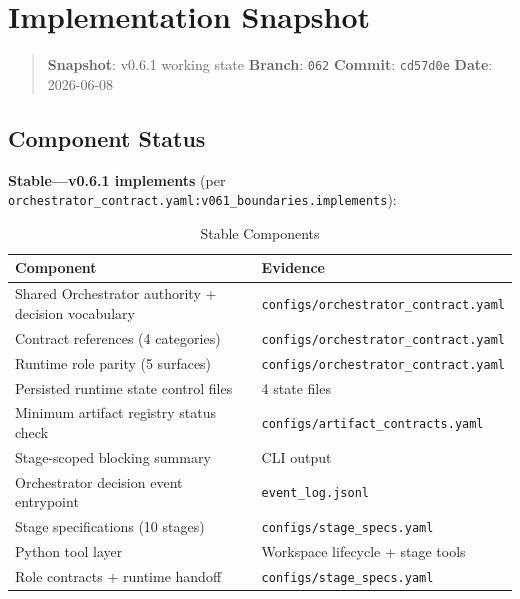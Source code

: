 \documentclass[11pt,a4paper]{article}
\begin{document}
\section{Implementation Snapshot}
\label{sec:snapshot}

\begin{quote}
\textbf{Snapshot}: v0.6.1 working state \textbar{} \textbf{Branch}: \texttt{062} \textbar{} \textbf{Commit}: \texttt{cd57d0e} \textbar{} \textbf{Date}: 2026-06-08
\end{quote}

\subsection{Component Status}

\textbf{Stable---v0.6.1 implements} (per \texttt{orchestrator\_contract.yaml:v061\_boundaries.implements}):

\begin{table}[ht]
\centering
\caption{Stable Components}
\label{tab:stable}
\footnotesize
\begin{tabular}{@{}ll@{}}
\toprule
\textbf{Component} & \textbf{Evidence} \\
\midrule
Shared Orchestrator authority + decision vocabulary & \texttt{configs/orchestrator\_contract.yaml} \\
Contract references (4 categories) & \texttt{configs/orchestrator\_contract.yaml} \\
Runtime role parity (5 surfaces) & \texttt{configs/orchestrator\_contract.yaml} \\
Persisted runtime state control files & 4 state files \\
Minimum artifact registry status check & \texttt{configs/artifact\_contracts.yaml} \\
Stage-scoped blocking summary & CLI output \\
Orchestrator decision event entrypoint & \texttt{event\_log.jsonl} \\
Stage specifications (10 stages) & \texttt{configs/stage\_specs.yaml} \\
Python tool layer & Workspace lifecycle + stage tools \\
Role contracts + runtime handoff & \texttt{configs/stage\_specs.yaml} \\
\bottomrule
\end{tabular}
\end{table}
\end{document}
